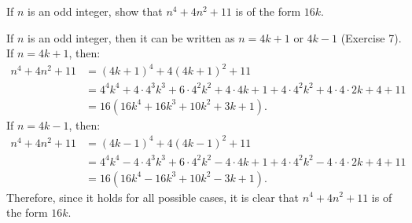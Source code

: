\begin{exercise}
    If $n$ is an odd integer, show that $n^4 + 4n^2 + 11$ is of the form $16k$. \\
\end{exercise}

\begin{solution}
    If $n$ is an odd integer, then it can be written as $n = 4k + 1$ or $4k -1$ (Exercise 7). If $n = 4k+1$, then:
    \begin{align*}
        n^4 + 4n^2 + 11 &= (4k + 1)^4 + 4(4k + 1)^2 + 11 \\
        &= 4^4k^4 + 4 \cdot 4^3k^3 + 6\cdot 4^2k^2 + 4\cdot 4k + 1 + 4\cdot 4^2 k^2 + 4\cdot 4 \cdot 2k + 4 + 11 \\
        &= 16(16k^4 + 16k^3 + 10k^2 + 3k + 1).
    \end{align*}
    If $n = 4k-1$, then:
    \begin{align*}
        n^4 + 4n^2 + 11 &= (4k - 1)^4 + 4(4k - 1)^2 + 11 \\
        &= 4^4k^4 - 4 \cdot 4^3k^3 + 6\cdot 4^2k^2 - 4\cdot 4k + 1 + 4\cdot 4^2 k^2 - 4\cdot 4 \cdot 2k + 4 + 11 \\
        &= 16(16k^4 - 16k^3 + 10k^2 - 3k + 1).
    \end{align*}
    Therefore, since it holds for all possible cases, it is clear that $n^4 + 4n^2 + 11$ is of the form $16k$.
\end{solution}